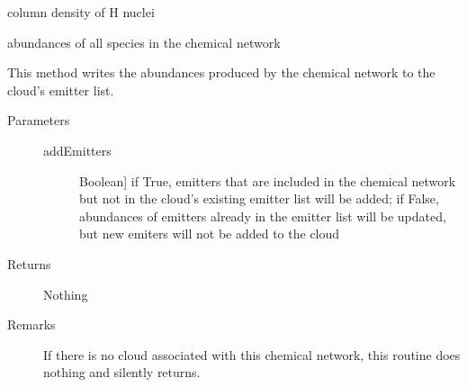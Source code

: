 \documentclass[letterpaper,10pt,english]{sphinxmanual}
\begin{document}
\begin{fulllineitems}
\begin{fulllineitems}
\end{fulllineitems}


\begin{fulllineitems}
\label{fulldoc:despotic.chemistry.NL99.NH}
column density of H nuclei

\end{fulllineitems}


\begin{fulllineitems}
\label{fulldoc:despotic.chemistry.NL99.abundances}
abundances of all species in the chemical network

\end{fulllineitems}


\begin{fulllineitems}
\label{fulldoc:despotic.chemistry.NL99.applyAbundances}
This method writes the abundances produced by the chemical
network to the cloud's emitter list.
\begin{description}
\item[{Parameters}] \leavevmode\begin{description}
\item[{addEmitters}] \leavevmode{[}Boolean{]}
if True, emitters that are included in the chemical
network but not in the cloud's existing emitter list will
be added; if False, abundances of emitters already in the
emitter list will be updated, but new emiters will not be
added to the cloud

\end{description}

\item[{Returns}] \leavevmode
Nothing

\item[{Remarks}] \leavevmode
If there is no cloud associated with this chemical network,
this routine does nothing and silently returns.

\end{description}

\end{fulllineitems}



\end{fulllineitems}
\end{document}

